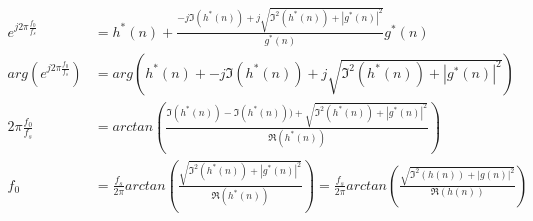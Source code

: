 \documentclass[main.tex]{subfiles}
\begin{document}
\begin{align*}
e^{j2\pi\frac{f_0}{f_s}} &= h^*(n) + \frac{-j\Im(h^*(n)) + j\sqrt{ \Im^2(h^*(n)) + |g^*(n)|^2 } }{g^*(n)}g^*(n)\\
arg(e^{j2\pi\frac{f_0}{f_s}}) &= arg\left(h^*(n) + -j\Im(h^*(n)) + j\sqrt{ \Im^2(h^*(n)) + |g^*(n)|^2 } \right)\\
2\pi\frac{f_0}{f_s} &= arctan(\frac{\Im(h^*(n)) - \Im(h^*(n)))+\sqrt{ \Im^2(h^*(n)) + |g^*(n)|^2 }}{\Re(h^*(n))})\\
f_0 &= \frac{f_s}{2\pi}arctan(\frac{\sqrt{ \Im^2(h^*(n)) + |g^*(n)|^2 }}{\Re(h^*(n))}) = \frac{f_s}{2\pi}arctan(\frac{\sqrt{ \Im^2(h(n)) + |g(n)|^2 }}{\Re(h(n))})
\end{align*}
\end{document}
